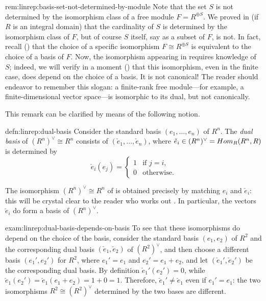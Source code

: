 \begin{rem}{}{rem:linrep:basis-set-not-determined-by-module}
  Note that the set $S$ is not determined by the isomorphism class of
  a free module $F = R^{\oplus S}$. We proved in 
  (if $R$ is an integral domain) that the cardinality of $S$ is
  determined by the isomorphism class of $F$, but of course $S$
  itself, say as a subset of $F$, is not. In fact, recall
  () that the
  choice of a specific isomorphism $F \cong R^{\oplus S}$ is
  equivalent to the choice of a basis of $F$. Now, the isomorphism
  appearing in  requires knowledge of $S$;
  indeed, we will verify in a moment () that
  this isomorphism, even in the finite case, does depend on the choice
  of a basis. It is not canonical! The reader should endeavor to
  remember this slogan: a finite-rank free module---for example, a
  finite-dimensional vector space---is isomorphic to its dual, but not
  canonically.
\end{rem}

This remark can be clarified by means of the following notion.
\begin{defn}{}{defn:linrep:dual-basis}
  Consider the standard basis $(e_1, \dots, e_n)$ of $R^n$. The
  \emph{dual basis} of $(R^n)^\vee \cong R^n$ consists of
  $(\check{e}_1, \dots, \check{e}_n)$, where
  $\check{e}_i \in (R^n)^\vee = Hom_R(R^n, R)$ is determined by
  \[
    \check{e}_i(e_j) = \begin{cases} 1 & \text{if } j = i, \\
      0 & \text{otherwise.} \end{cases}
  \]
\end{defn}

The isomorphism $(R^n)^\vee \cong R^n$ of 
is obtained precisely by matching $e_i$ and $\check{e}_i$: this will
be crystal clear to the reader who works out
. In
particular, the vectors $\check{e}_i$ do form a basis of $(R^n)^\vee$.

\begin{exam}{}{exam:linrep:dual-basis-depends-on-basis}
  To see that these isomorphisms do depend on the choice of the basis,
  consider the standard basis $(e_1, e_2)$ of $R^2$ and the
  corresponding dual basis $(\check{e}_1, \check{e}_2)$ of
  $(R^2)^\vee$, and then choose a different basis $(e_1', e_2')$ for
  $R^2$, where $e_1' = e_1$ and $e_2' = e_1 + e_2$, and let
  $(\check{e}_1', \check{e}_2')$ be the corresponding dual basis. By
  definition $\check{e}_1'(e_2') = 0$, while
  $\check{e}_1(e_2') = \check{e}_1(e_1 + e_2) = 1 + 0 = 1$.
  Therefore, $\check{e}_1' \neq \check{e}_1$ even if $e_1' = e_1$: the
  two isomorphisms $R^2 \cong (R^2)^\vee$ determined by the two bases
  are different.
\end{exam}

